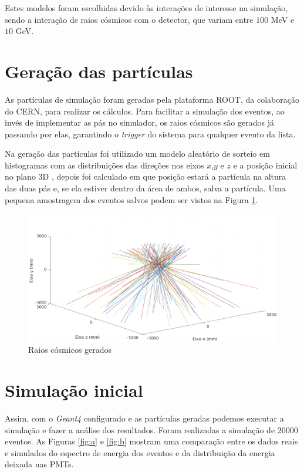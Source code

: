 Estes modelos foram escolhidas devido às interações de interesse na simulação, sendo a interação de raios cósmicos com o detector, que variam entre $100$ MeV e $10$ GeV.


\section{Geração das partículas}

As partículas de simulação foram geradas pela plataforma ROOT, da colaboração do \ac{CERN}, para realizar os cálculos. Para facilitar a simulação dos eventos, ao invés de implementar as pás no simulador, os raios cósmicos são gerados já passando por elas, garantindo o \emph{trigger} do sistema para qualquer evento da lista. 

 Na geração das partículas foi utilizado um modelo aleatório de sorteio em histogramas com as distribuições das direções nos eixos $x$,$y$ e $z$ e a posição inicial no plano 3D \cite{amarogithub}, depois foi calculado em que posição estará a partícula na altura das duas pás e, se ela estiver dentro da área de ambos, salva a partícula. Uma pequena amostragem dos eventos salvos podem ser vistos na Figura \ref{fig:geracao}.

\begin{figure}[H]
	\centering
	\includegraphics[width=14cm]{textuais/simulacao/figuras/geracao.pdf}
	\caption{Raios cósmicos gerados}
	\label{fig:geracao}
\end{figure}


\section{Simulação inicial}

Assim, com o \emph{Geant4} configurado e as partículas geradas podemos executar a simulação e fazer a análise dos resultados. Foram realizadas a simulação de $20000$ eventos. As Figuras \ref{fig:a} e \ref{fig:b} mostram uma comparação entre os dados reais e simulados do espectro de energia dos eventos e da distribuição da energia deixada nas PMTs.

